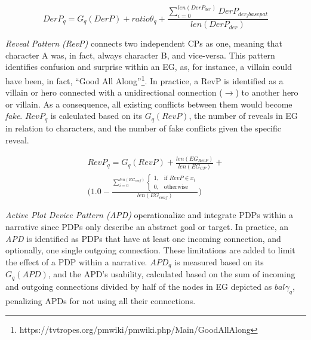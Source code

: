 
\begin{equation}
\label{eq:derp}
    DerP_{q} = G_{q}(DerP) + 
    ratio\theta_{q} + 
    \frac{\sum_{i=0}^{len(DerP_{der})}DerP_{der_ibasepat}}{len(DerP_{der})}
\end{equation}

\emph{Reveal Pattern (RevP)} connects two independent CPs as one, meaning that character A was, in fact, always character B, and vice-versa. This pattern identifies confusion and surprise within an EG, as, for instance, a villain could have been, in fact, ``Good All Along''\footnote{https://tvtropes.org/pmwiki/pmwiki.php/Main/GoodAllAlong}. In practice, a RevP is identified as a villain or hero connected with a unidirectional connection ($\rightarrow$) to another hero or villain. As a consequence, all existing conflicts between them would become \emph{fake}. $RevP_{q}$ is calculated based on its $G_{q}(RevP)$, the number of reveals in EG in relation to characters, and the number of fake conflicts given the specific reveal.

\begin{multline}
    RevP_{q} = G_{q}(RevP) + \frac{len(EG_{RevP})}{len(EG_{CP})} +  \\ \Bigg( 1.0 - \frac{\sum_{i=0}^{len(EG_{conf})}    \begin{cases}
        1,& \text{if } RevP \in x_{i}\\
        0,              & \text{otherwise}
    \end{cases}}{len(EG_{conf})} \Biggl)
\end{multline}

\emph{Active Plot Device Pattern (APD)} operationalize and integrate PDPs within a narrative since PDPs only describe an abstract goal or target. In practice, an \textit{APD} is identified as PDPs that have at least one incoming connection, and optionally, one single outgoing connection. These limitations are added to limit the effect of a PDP within a narrative. $APD_{q}$ is measured based on its $G_{q}(APD)$, and the APD's usability, calculated based on the sum of incoming and outgoing connections divided by half of the nodes in EG depicted as $bal\gamma_{q}$, penalizing APDs for not using all their connections. %

